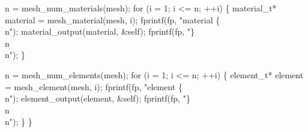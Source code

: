     n = mesh_num_materials(mesh);
    for (i = 1; i <= n; ++i) \{
        material_t* material = mesh_material(mesh, i);
        fprintf(fp, "material \{\\n");
        material_output(material, &self);
        fprintf(fp, "\}\\n\\n");
    \}

    n = mesh_num_elements(mesh);
    for (i = 1; i <= n; ++i) \{
        element_t* element = mesh_element(mesh, i);
        fprintf(fp, "element \{\\n");
        element_output(element, &self);
        fprintf(fp, "\}\\n\\n");
    \}
\}

\nwendcode{}

%
%
%
%
\nwdocspar

\nwenddocs{}
